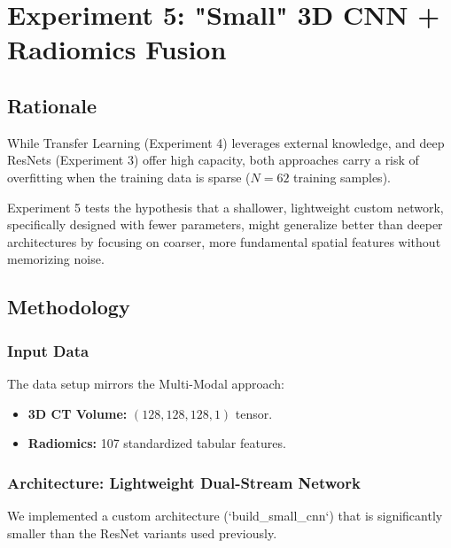 \section{Experiment 5: "Small" 3D CNN + Radiomics Fusion}

\subsection{Rationale}
While Transfer Learning (Experiment 4) leverages external knowledge, and deep ResNets (Experiment 3) offer high capacity, both approaches carry a risk of overfitting when the training data is sparse ($N=62$ training samples). 

Experiment 5 tests the hypothesis that a shallower, lightweight custom network, specifically designed with fewer parameters, might generalize better than deeper architectures by focusing on coarser, more fundamental spatial features without memorizing noise.

\subsection{Methodology}

\subsubsection{Input Data}
The data setup mirrors the Multi-Modal approach:
\begin{itemize}
    \item \textbf{3D CT Volume:} $(128, 128, 128, 1)$ tensor.
    \item \textbf{Radiomics:} 107 standardized tabular features.
\end{itemize}

\subsubsection{Architecture: Lightweight Dual-Stream Network}
We implemented a custom architecture (`build\_small\_cnn`) that is significantly smaller than the ResNet variants used previously.


